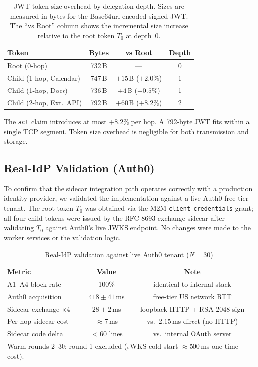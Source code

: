 \documentclass[journal]{IEEEtran}
\begin{document}
\begin{table}[h]
\caption{JWT token size overhead by delegation depth. Sizes are measured in bytes
for the Base64url-encoded signed JWT. The ``vs Root'' column shows the incremental
size increase relative to the root token $T_0$ at depth~0.}
\label{tab:tokensizes}
\centering
\footnotesize
\begin{tabular}{lccc}
\toprule
\textbf{Token} & \textbf{Bytes} & \textbf{vs Root} & \textbf{Depth} \\
\midrule
Root (0-hop)             & 732\,B & ---                    & 0 \\
Child (1-hop, Calendar)  & 747\,B & $+15$\,B ($+2.0\%$)   & 1 \\
Child (1-hop, Docs)      & 736\,B & $+4$\,B ($+0.5\%$)    & 1 \\
Child (2-hop, Ext.\ API) & 792\,B & $+60$\,B ($+8.2\%$)   & 2 \\
\bottomrule
\end{tabular}
\end{table}

The \texttt{act} claim introduces at most $+8.2\%$ per hop. A 792-byte JWT
fits within a single TCP segment. Token size overhead is negligible for both
transmission and storage.


\subsection{Real-IdP Validation (Auth0)}
\label{sec:auth0_validation}

To confirm that the sidecar integration path operates correctly with a
production identity provider, we validated the implementation against a live
Auth0 free-tier tenant. The root token $T_0$ was obtained via the M2M
\texttt{client\_credentials} grant; all four child tokens were issued by the
RFC 8693 exchange sidecar after validating $T_0$ against Auth0's live JWKS
endpoint. No changes were made to the worker services or the validation logic.

\begin{table}[h]
\caption{Real-IdP validation against live Auth0 tenant ($N=30$)}
\label{tab:auth0}
\centering
\footnotesize
\setlength{\tabcolsep}{4pt}
\begin{tabular}{lcc}
\toprule
\textbf{Metric} & \textbf{Value} & \textbf{Note} \\
\midrule
A1--A4 block rate    & 100\%              & identical to internal stack \\
Auth0 acquisition    & $418 \pm 41$\,ms   & free-tier US network RTT \\
Sidecar exchange ×4  & $28 \pm 2$\,ms     & loopback HTTP + RSA-2048 sign \\
Per-hop sidecar cost & $\approx 7$\,ms    & vs.\ $2.15$\,ms direct (no HTTP) \\
Sidecar code delta   & $<60$ lines        & vs.\ internal OAuth server \\
\bottomrule
\multicolumn{3}{l}{\scriptsize Warm rounds 2--30; round 1 excluded (JWKS cold-start
  $\approx$500\,ms one-time cost).}
\end{tabular}
\end{table}
\end{document}

